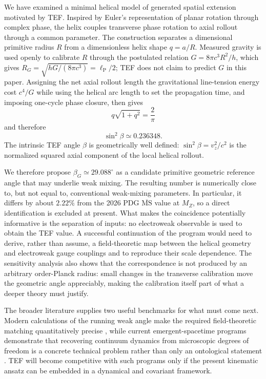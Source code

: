 \documentclass[aps,prd,reprint,nofootinbib,floatfix]{revtex4-2}
\begin{document}
We have examined a minimal helical model of generated spatial extension motivated by TEF.  Inspired by Euler's representation of planar rotation through complex phase, the helix couples transverse phase rotation to axial rollout through a common parameter.  The construction separates a dimensional primitive radius $R$ from a dimensionless helix shape $q=a/R$.  Measured gravity is used openly to calibrate $R$ through the postulated relation $G=8\pi c^3R^2/h$, which gives $R_G=\sqrt{hG/(8\pi c^3)}=\ell_{\mathrm P}/2$; TEF does not claim to predict $G$ in this paper.  Assigning the net axial rollout length the gravitational line-tension energy cost $c^4/G$ while using the helical arc length to set the propagation time, and imposing one-cycle phase closure, then gives
\begin{equation}
q\sqrt{1+q^2}=\frac{2}{\pi}
\end{equation}
and therefore
\begin{equation}
\sin^2\beta\simeq0.236348.
\end{equation}
The intrinsic TEF angle $\beta$ is geometrically well defined: $\sin^2\beta=v_z^2/c^2$ is the normalized squared axial component of the local helical rollout.

We therefore propose $\beta_G\simeq29.088^\circ$ as a candidate primitive geometric reference angle that may underlie weak mixing.  The resulting number is numerically close to, but not equal to, conventional weak-mixing parameters.  In particular, it differs by about $2.22\%$ from the 2026 PDG $\overline{\mathrm{MS}}$ value at $M_Z$, so a direct identification is excluded at present.  What makes the coincidence potentially informative is the separation of inputs: no electroweak observable is used to obtain the TEF value.  A successful continuation of the program would need to derive, rather than assume, a field-theoretic map between the helical geometry and electroweak gauge couplings and to reproduce their scale dependence.  The sensitivity analysis also shows that the correspondence is not produced by an arbitrary order-Planck radius: small changes in the transverse calibration move the geometric angle appreciably, making the calibration itself part of what a deeper theory must justify.

The broader literature supplies two useful benchmarks for what must come next.  Modern calculations of the running weak angle make the required field-theoretic matching quantitatively precise \cite{ErlerFerroKuberski2024,SpiesbergerWezorke2024}, while current emergent-spacetime programs demonstrate that recovering continuum dynamics from microscopic degrees of freedom is a concrete technical problem rather than only an ontological statement \cite{CalcinariDelhomOriti2026,DekhilGrecoLiberatiOriti2026,Rainer2026}.  TEF will become competitive with such programs only if the present kinematic ansatz can be embedded in a dynamical and covariant framework.
\end{document}
